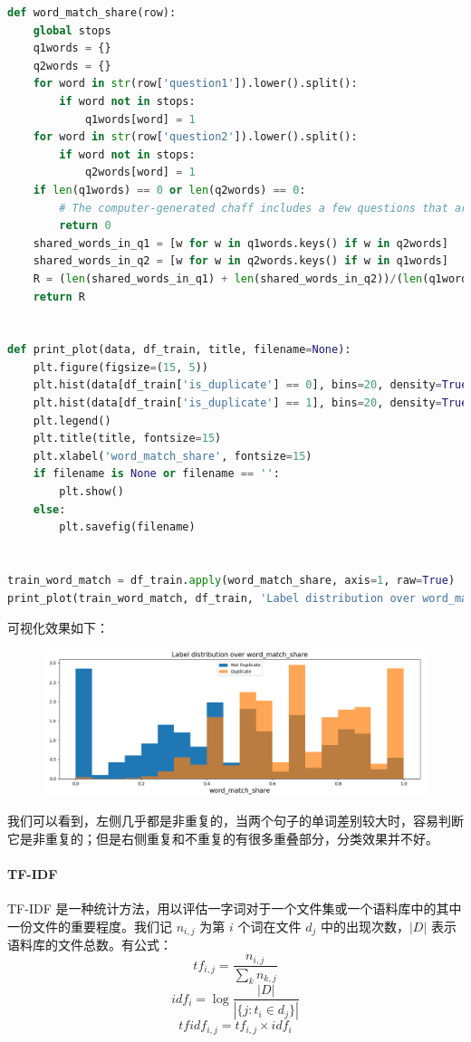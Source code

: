 \documentclass{article}
\begin{document}
\begin{lstlisting}[language=python]
def word_match_share(row):
    global stops
    q1words = {}
    q2words = {}
    for word in str(row['question1']).lower().split():
        if word not in stops:
            q1words[word] = 1
    for word in str(row['question2']).lower().split():
        if word not in stops:
            q2words[word] = 1
    if len(q1words) == 0 or len(q2words) == 0:
        # The computer-generated chaff includes a few questions that are nothing but stopwords
        return 0
    shared_words_in_q1 = [w for w in q1words.keys() if w in q2words]
    shared_words_in_q2 = [w for w in q2words.keys() if w in q1words]
    R = (len(shared_words_in_q1) + len(shared_words_in_q2))/(len(q1words) + len(q2words))
    return R


def print_plot(data, df_train, title, filename=None):
    plt.figure(figsize=(15, 5))
    plt.hist(data[df_train['is_duplicate'] == 0], bins=20, density=True, label='Not Duplicate')
    plt.hist(data[df_train['is_duplicate'] == 1], bins=20, density=True, alpha=0.7, label='Duplicate')
    plt.legend()
    plt.title(title, fontsize=15)
    plt.xlabel('word_match_share', fontsize=15)
    if filename is None or filename == '':
        plt.show()
    else:
        plt.savefig(filename)


train_word_match = df_train.apply(word_match_share, axis=1, raw=True)
print_plot(train_word_match, df_train, 'Label distribution over word_match_share', '1.png')
\end{lstlisting}

可视化效果如下：

\begin{figure}[!h]
\centering
\includegraphics[scale=0.5]{1.png}
\end{figure}

我们可以看到，左侧几乎都是非重复的，当两个句子的单词差别较大时，容易判断它是非重复的；但是右侧重复和不重复的有很多重叠部分，分类效果并不好。

\paragraph{TF-IDF}
TF-IDF 是一种统计方法，用以评估一字词对于一个文件集或一个语料库中的其中一份文件的重要程度。我们记 $n_{i, j}$ 为第 $i$ 个词在文件 $d_j$ 中的出现次数，$|D|$ 表示语料库的文件总数。有公式：
$$tf_{i, j} = \frac{n_{i, j}}{\sum\limits_{k} n_{k, j}}$$
$$idf_{i} = \log \frac{|D|}{|\{j:t_i \in d_j\}|}$$
$$tfidf_{i, j} = tf_{i, j} \times idf_i$$
\end{document}
